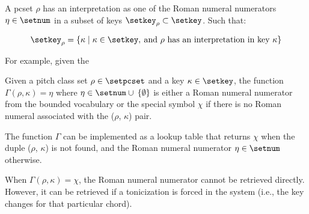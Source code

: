 
A \gls{pcset} $\rho$ has an interpretation as one of the
Roman numeral numerators $\eta \in \setnum$ in a subset of
keys $\setkey_{\rho} \subset \setkey$. Such that:

\begin{equation}
    \setkey_{\rho} = \{\kappa \mid \kappa \in \setkey,
     \: \text{and $\rho$ has an interpretation in key $\kappa$}\}
\end{equation}

For example, given the 

Given a pitch class set $\rho \in \setpcset$ and a key
$\kappa \in \setkey$, the function $\Gamma(\rho, \kappa) =
\eta$ where $\eta \in \setnum \cup \: \{ \emptyset \}$ is
either a Roman numeral numerator from the bounded vocabulary
or the special symbol $\chi$ if there is no Roman numeral
associated with the ($\rho$, $\kappa$) pair.

The function $\Gamma$ can be implemented as a lookup table
that returns $\chi$ when the duple ($\rho$, $\kappa$) is not
found, and the Roman numeral numerator $\eta \in \setnum$
otherwise.

When $\Gamma(\rho, \kappa) = \chi$, the Roman numeral
numerator cannot be retrieved directly. However, it can be
retrieved if a tonicization is forced in the system (i.e.,
the key changes for that particular chord).

